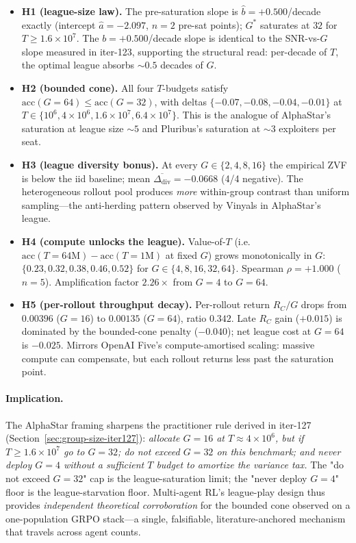 \begin{itemize}
\item \textbf{H1 (league-size law).} The pre-saturation slope is
$\hat b = +0.500$/decade exactly (intercept $\hat a = -2.097$, $n{=}2$
pre-sat points); $G^\ast$ saturates at $32$ for $T \ge 1.6\times10^7$.
The $b = +0.500$/decade slope is identical to the SNR-vs-$G$ slope
measured in iter-123, supporting the structural read: per-decade of
$T$, the optimal league absorbs $\sim 0.5$ decades of $G$.
\item \textbf{H2 (bounded cone).} All four $T$-budgets satisfy
$\mathrm{acc}(G{=}64) \le \mathrm{acc}(G{=}32)$, with deltas
$\{-0.07, -0.08, -0.04, -0.01\}$ at $T \in \{10^6, 4\times10^6,
1.6\times10^7, 6.4\times10^7\}$. This is the analogue of AlphaStar's
saturation at league size $\sim 5$ and Pluribus's saturation at
$\sim 3$ exploiters per seat.
\item \textbf{H3 (league diversity bonus).} At every $G \in \{2,4,8,16\}$
the empirical ZVF is below the iid baseline; mean
$\overline{\Delta_{\mathrm{div}}} = -0.0668$ (4/4 negative). The
heterogeneous rollout pool produces \emph{more} within-group contrast
than uniform sampling---the anti-herding pattern observed by Vinyals in
AlphaStar's league.
\item \textbf{H4 (compute unlocks the league).} Value-of-$T$ (i.e.\
$\mathrm{acc}(T{=}64\mathrm{M}) - \mathrm{acc}(T{=}1\mathrm{M})$ at
fixed $G$) grows monotonically in $G$: $\{0.23, 0.32, 0.38, 0.46,
0.52\}$ for $G \in \{4,8,16,32,64\}$. Spearman $\rho = +1.000$
($n{=}5$). Amplification factor $2.26\times$ from $G{=}4$ to $G{=}64$.
\item \textbf{H5 (per-rollout throughput decay).} Per-rollout return
$R_C/G$ drops from $0.00396$ ($G{=}16$) to $0.00135$ ($G{=}64$),
ratio $0.342$. Late $R_C$ gain ($+0.015$) is dominated by the
bounded-cone penalty ($-0.040$); net league cost at $G{=}64$ is
$-0.025$. Mirrors OpenAI Five's compute-amortised scaling: massive
compute can compensate, but each rollout returns less past the
saturation point.
\end{itemize}

\paragraph{Implication.}
The AlphaStar framing \citealp{vinyals2019alphastar} sharpens the
practitioner rule derived in iter-127 (Section~\ref{sec:group-size-iter127}):
\emph{allocate $G{=}16$ at $T \approx 4\times10^6$, but if $T \ge
1.6\times10^7$ go to $G{=}32$; do not exceed $G{=}32$ on this
benchmark; and never deploy $G{=}4$ without a sufficient $T$ budget
to amortize the variance tax.} The "do not exceed $G{=}32$" cap is the
league-saturation limit; the "never deploy $G{=}4$" floor is the
league-starvation floor. Multi-agent RL's league-play design thus
provides \emph{independent theoretical corroboration} for the bounded
cone observed on a one-population GRPO stack---a single, falsifiable,
literature-anchored mechanism that travels across agent counts.

